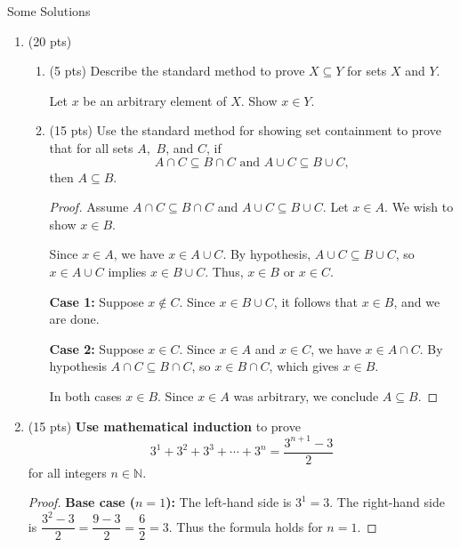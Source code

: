 \documentclass[11pt]{article}
\newcommand{\N}{{\mathbb{N}}}
\begin{document}
\thispagestyle{fancy}

Some Solutions\\
\begin{enumerate}
\item (20 pts) 
	\begin{enumerate}
	\item (5 pts) Describe the standard method to prove $X \subseteq Y$ for sets $X$ and $Y$.
	
	Let $x$ be an arbitrary element of $X$. Show $x \in Y.$\\
	\item (15 pts) Use the standard method for showing set containment to prove that for all sets $A,$ $B$, and $C$, if $$A\cap C \subseteq B \cap C \text{   and   } A\cup C \subseteq B \cup C,$$
	then $A \subseteq B.$
	
	\begin{proof}
	Assume $A \cap C \subseteq B \cap C$ and $A \cup C \subseteq B \cup C$. Let $x \in A$. We wish to show $x \in B$.

Since $x \in A$, we have $x \in A \cup C.$ By hypothesis,  $A \cup C \subseteq B \cup C$, so $x \in A \cup C$ implies   $x \in B \cup C$.  Thus, $x \in B$ or $x \in C$. 

\textbf{Case 1:} Suppose $x \notin C$. Since $x \in B \cup C$, it follows that $x \in B$, and we are done.

\textbf{Case 2:} Suppose $x \in C$. Since $x \in A$ and $x \in C$, we have $x \in A \cap C$. By hypothesis $A \cap C \subseteq B \cap C$, so $x \in B \cap C$, which gives $x \in B$.

In both cases $x \in B$. Since $x \in A$ was arbitrary, we conclude $A \subseteq B$.
\end{proof}
	\end{enumerate}
\item (15 pts) \textbf{Use mathematical induction} to prove $$3^1+3^2+3^3 + \cdots + 3^n = \frac{3^{n+1}-3}{2}$$ for all integers $n \in \N.$

\begin{proof}
\textbf{Base case ($n=1$):} The left-hand side is $3^1 = 3$. The right-hand side is $\dfrac{3^{2}-3}{2} = \dfrac{9-3}{2} = \dfrac{6}{2} = 3$. Thus the formula holds for $n=1$.


\end{proof}
\end{enumerate}
\end{document}
